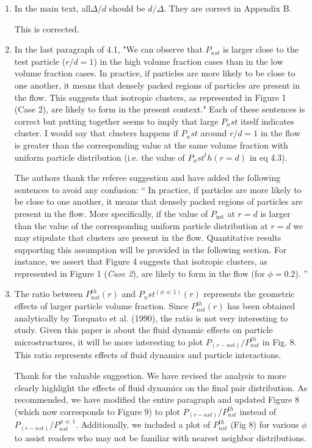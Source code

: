 \documentclass[10pt,a4paper]{article}
\newcommand{\tb}[1]{\color{blue}#1\color{black}}
\begin{document}
\begin{enumerate}
    \item 
 In the main text, all$\Delta/d$ should be $d/\Delta$. They are correct in Appendix B.

 \tb{This is corrected. }

\item
 In the last paragraph of 4.1, "We can observe that $P_{nst}$ is larger close to the test particle ($r/d = 1$) in the high volume fraction cases than in the low volume fraction cases. In practice, if particles are more likely to be close to one another, it means that densely packed regions of particles are present in the flow. This suggests that isotropic clusters, as represented in Figure 1 (Case 2), are likely to form in the present context." Each of these sentences is correct but putting together seems to imply that large $P_nst$ itself indicates cluster. I would say that clusters happens if $P_nst$ around $r/d = 1$ in the flow is greater than the corresponding value at the same volume fraction with uniform particle distribution (i.e. the value of $P_nst^th(r=d)$ in eq 4.3).

\tb{The authors thank the referee suggestion and have added the following sentences to avoid any confusion: 
``
In practice, if particles are more likely to be close to one another, it means that densely packed regions of particles are present in the flow.
More specifically, if the value of $P_\text{nst}$ at $r=d$ is larger than the value of the corresponding uniform particle distribution at $r=d$  we may stipulate that clusters are present in the flow. 
Quantitative results supporting this assumption will be provided in the following section. 
For instance, we assert that Figure 4 suggests that isotropic clusters, as represented in Figure 1 (\textit{Case 2}), are likely to form in the flow (for $\phi = 0.2$). 
''
}

\item
 The ratio between $P_{nst}^{th}(r)$ and $P_nst^(\phi\ll 1)(r)$ represents the geometric effects of larger particle volume fraction.  Since $P_{nst}^{th}(r)$ has been obtained analytically by Torquato et al. (1990), the ratio is not very interesting to study. Given this paper is about the fluid dynamic effects on particle microstructures, it will be more interesting to plot $P_{(r-nst)}/P_{nst}^{th}$ in Fig. 8. This ratio represents effects of fluid dynamics and particle interactions.

 \tb{
    Thank for the valuable suggestion. 
    We have revised the analysis to more clearly highlight the effects of fluid dynamics on the final pair distribution. 
    As recommended, we have modified the entire paragraph and updated Figure 8 (which now corresponds to Figure 9) to plot $P_{(r-nst)}/P_{nst}^{th}$ instead of $P_{(r-nst)}/P_{nst}^{\phi\ll 1}$.
    Additionally, we included a plot of $P_{nst}^{th}$ (Fig 8) for various $\phi$ to assist readers who may not be familiar with nearest neighbor distributions. 
 }

\end{enumerate}
\end{document}
